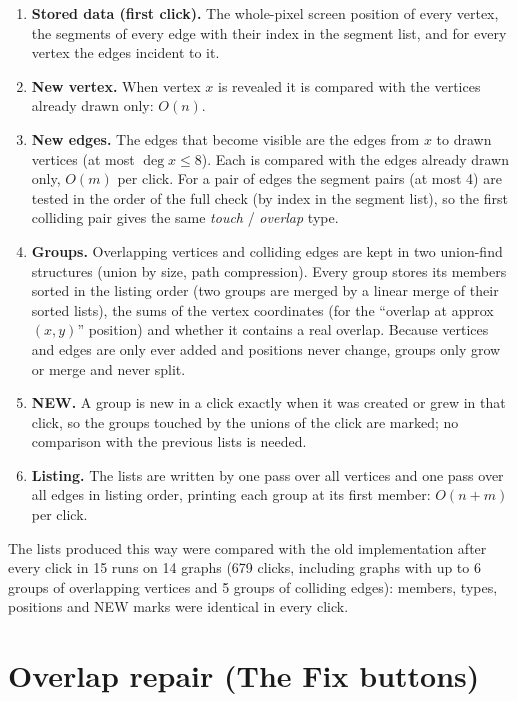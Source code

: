 \documentclass[11pt,a4paper]{article}
\begin{document}
\begin{enumerate}
  \item \textbf{Stored data (first click).} The whole-pixel screen position of every vertex, the segments of every edge with their index in the segment list, and for every vertex the edges incident to it.
  \item \textbf{New vertex.} When vertex $x$ is revealed it is compared with the vertices already drawn only: $O(n)$.
  \item \textbf{New edges.} The edges that become visible are the edges from $x$ to drawn vertices (at most $\deg x\le 8$). Each is compared with the edges already drawn only, $O(m)$ per click. For a pair of edges the segment pairs (at most 4) are tested in the order of the full check (by index in the segment list), so the first colliding pair gives the same \emph{touch} / \emph{overlap} type.
  \item \textbf{Groups.} Overlapping vertices and colliding edges are kept in two union-find structures (union by size, path compression). Every group stores its members sorted in the listing order (two groups are merged by a linear merge of their sorted lists), the sums of the vertex coordinates (for the ``overlap at approx $(x,y)$'' position) and whether it contains a real overlap. Because vertices and edges are only ever added and positions never change, groups only grow or merge and never split.
  \item \textbf{NEW.} A group is new in a click exactly when it was created or grew in that click, so the groups touched by the unions of the click are marked; no comparison with the previous lists is needed.
  \item \textbf{Listing.} The lists are written by one pass over all vertices and one pass over all edges in listing order, printing each group at its first member: $O(n+m)$ per click.
\end{enumerate}

\noindent The lists produced this way were compared with the old implementation after every click in 15 runs on 14 graphs (679 clicks, including graphs with up to 6 groups of overlapping vertices and 5 groups of colliding edges): members, types, positions and NEW marks were identical in every click.

\section{Overlap repair (The Fix buttons)}
\label{sec:fix}
\end{document}
